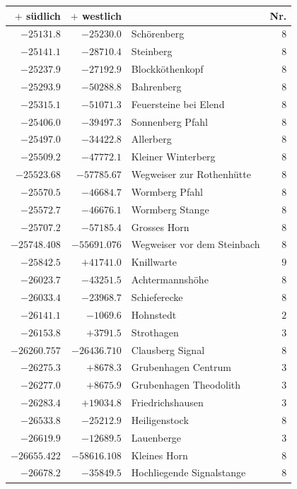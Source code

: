\begin{center}\begingroup\fontsize{8}{9}\selectfont
\setlength{\tabcolsep}{4pt}
\begin{tabular}{r|r|p{170pt}|r}\hline
\(+\) südlich&\(+\) westlich&&Nr.\\\hline
\(-25131.8\)&\(-25230.0\)&Schörenberg&\(8\)\\
\(-25141.1\)&\(-28710.4\)&Steinberg&\(8\)\\
\(-25237.9\)&\(-27192.9\)&Blockköthenkopf&\(8\)\\
\(-25293.9\)&\(-50288.8\)&Bahrenberg&\(8\)\\
\(-25315.1\)&\(-51071.3\)&Feuersteine bei Elend&\(8\)\\
\(-25406.0\)&\(-39497.3\)&Sonnenberg Pfahl&\(8\)\\
\(-25497.0\)&\(-34422.8\)&Allerberg&\(8\)\\
\(-25509.2\)&\(-47772.1\)&Kleiner Winterberg&\(8\)\\
\(-25523.68\)&\(-57785.67\)&Wegweiser zur Rothenhütte&\(8\)\\
\(-25570.5\)&\(-46684.7\)&Wormberg Pfahl&\(8\)\\
\(-25572.7\)&\(-46676.1\)&Wormberg Stange&\(8\)\\
\(-25707.2\)&\(-57185.4\)&Grosses Horn&\(8\)\\
\(-25748.408\)&\(-55691.076\)&Wegweiser vor dem Steinbach&\(8\)\\
\(-25842.5\)&\(+41741.0\)&Knillwarte&\(9\)\\
\(-26023.7\)&\(-43251.5\)&Achtermannshöhe&\(8\)\\
\(-26033.4\)&\(-23968.7\)&Schieferecke&\(8\)\\
\(-26141.1\)&\(-1069.6\)&Hohnstedt&\(2\)\\
\(-26153.8\)&\(+3791.5\)&Strothagen&\(3\)\\
\(-26260.757\)&\(-26436.710\)&Clausberg Signal&\(8\)\\
\(-26275.3\)&\(+8678.3\)&Grubenhagen Centrum&\(3\)\\
\(-26277.0\)&\(+8675.9\)&Grubenhagen Theodolith&\(3\)\\
\(-26283.4\)&\(+19034.8\)&Friedrichshausen&\(3\)\\
\(-26533.8\)&\(-25212.9\)&Heiligenstock&\(8\)\\
\(-26619.9\)&\(-12689.5\)&Lauenberge&\(3\)\\
\(-26655.422\)&\(-58616.108\)&Kleines Horn&\(8\)\\
\(-26678.2\)&\(-35849.5\)&Hochliegende Signalstange&\(8\)\\

\end{tabular}
\end{center}
